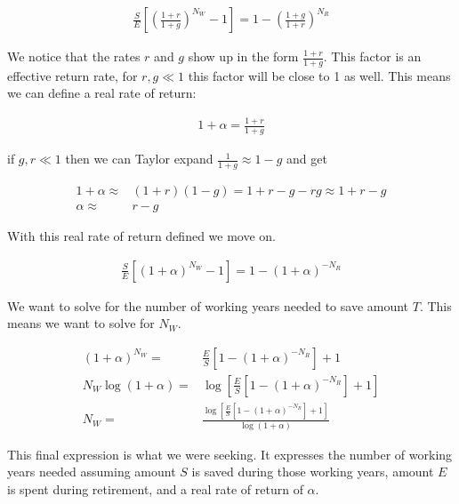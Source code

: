 \documentclass[12pt]{article}
\begin{document}
\begin{align}
\frac{S}{E}\left[\left(\frac{1+r}{1+g}\right)^{N_W} - 1\right] = 1-\left(\frac{1+g}{1+r}\right)^{N_R}
\end{align}


We notice that the rates $r$ and $g$ show up in the form $\frac{1+r}{1+g}$. 
This factor is an effective return rate, for $r,g \ll1$ this factor will be close to 1 as well.
This means we can define a real rate of return:

\begin{align}
1+\alpha = \frac{1+r}{1+g}
\end{align}

if $g, r \ll 1$ then we can Taylor expand $\frac{1}{1+g}\approx 1-g$ and get

\begin{align}
1+\alpha \approx& (1+r)(1-g) = 1 + r - g - rg \approx 1 + r - g\\
\alpha \approx& r-g
\end{align}

With this real rate of return defined we move on.

\begin{align}
\frac{S}{E}\left[(1+\alpha)^{N_W} - 1\right] = 1-(1+\alpha)^{-N_R}
\end{align}

We want to solve for the number of working years needed to save amount $T$.
This means we want to solve for $N_W$.

\begin{align}
(1+\alpha)^{N_W} =& \frac{E}{S}\left[1-(1+\alpha)^{-N_R}\right] + 1\\
N_W\log(1+\alpha) =& \log\left[\frac{E}{S}\left[1-(1+\alpha)^{-N_R}\right] + 1\right]\\
\label{eqes}
N_W =& \frac{\log\left[\frac{E}{S}\left[1-(1+\alpha)^{-N_R}\right] + 1\right]}{\log(1+\alpha)}
\end{align}

This final expression is what we were seeking.
It expresses the number of working years needed assuming amount $S$ is saved during those working years, amount $E$ is spent during retirement, and a real rate of return of $\alpha$.
\end{document}
